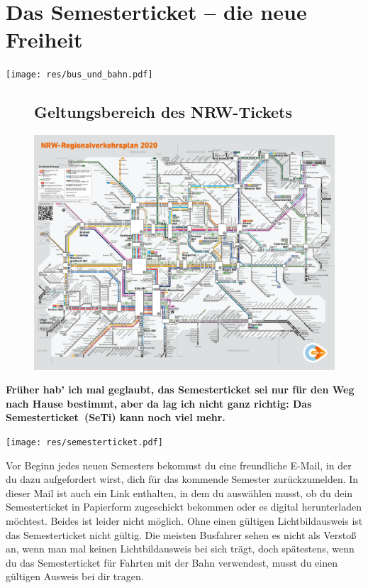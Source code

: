 \section{Das Semesterticket -- die neue Freiheit}

\begin{center}
	\texttt{[image: res/bus\_und\_bahn.pdf]}
\end{center}
\begin{multicols*}{2}
\begin{figure}[t]
	\subsection{Geltungsbereich des NRW-Tickets}
	\includegraphics[width=\textwidth]{res/regionalverkehrsplan_nrw.pdf}
\end{figure}
\textbf{Früher hab' ich mal geglaubt, das Semesterticket sei nur für den Weg nach Hause bestimmt, aber da lag ich nicht ganz richtig: Das Semesterticket~(SeTi) kann noch viel mehr.}

\texttt{[image: res/semesterticket.pdf]}

Vor Beginn jedes neuen Semesters bekommst du eine freundliche E-Mail, in der du dazu aufgefordert wirst, dich für das kommende Semester zurückzumelden. In dieser Mail ist auch ein Link enthalten, in dem du auswählen musst, ob du dein Semesterticket in Papierform zugeschickt bekommen oder es digital herunterladen möchtest. Beides ist leider nicht möglich.
Ohne einen gültigen Lichtbildausweis ist das Semesterticket nicht gültig.
Die meisten Busfahrer sehen es nicht als Verstoß an, wenn man mal keinen Lichtbildausweis bei sich trägt, doch spätestens, wenn du das Semesterticket für Fahrten mit der Bahn verwendest, musst du einen gültigen Ausweis bei dir tragen.


\end{multicols*}
